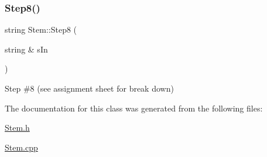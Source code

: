 \subsubsection{\texorpdfstring{Step8()}{Step8()}}
{\footnotesize\ttfamily string Stem\+::\+Step8 (\begin{DoxyParamCaption}\item[{string \&}]{s\+In }\end{DoxyParamCaption})}

Step \#8 (see assignment sheet for break down) 

The documentation for this class was generated from the following files\+:\begin{DoxyCompactItemize}
\item 
\hyperlink{_stem_8h}{Stem.\+h}\item 
\hyperlink{_stem_8cpp}{Stem.\+cpp}\end{DoxyCompactItemize}
